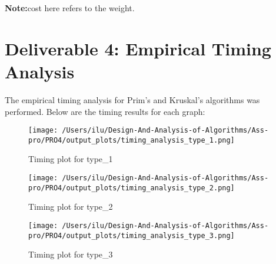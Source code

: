 \documentclass{article}
\begin{document}
\textbf{Note:}cost here refers to the weight.

\section*{Deliverable 4: Empirical Timing Analysis}

The empirical timing analysis for Prim's and Kruskal's algorithms was performed. Below are the timing results for each graph:


\begin{figure}
    \centering
    \texttt{[image: /Users/ilu/Design-And-Analysis-of-Algorithms/Ass-pro/PRO4/output\_plots/timing\_analysis\_type\_1.png]}
    \caption{Timing plot for type\_1}\label{fig:timing1}
\end{figure}
\begin{figure}
    \centering
    \texttt{[image: /Users/ilu/Design-And-Analysis-of-Algorithms/Ass-pro/PRO4/output\_plots/timing\_analysis\_type\_2.png]}
    \caption{Timing plot for type\_2}\label{fig:timing2}
\end{figure}
\begin{figure}
    \centering
    \texttt{[image: /Users/ilu/Design-And-Analysis-of-Algorithms/Ass-pro/PRO4/output\_plots/timing\_analysis\_type\_3.png]}
    \caption{Timing plot for type\_3}\label{fig:timing3}
\end{figure}
\end{document}
